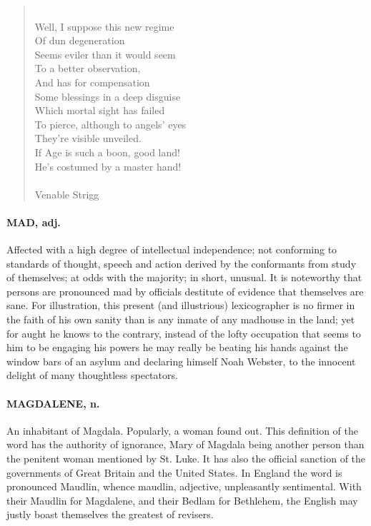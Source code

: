 \documentclass[11pt]{article}
\begin{document}
\begin{quote}
 \\
  Well, I suppose this new regime \\
      Of dun degeneration \\
  Seems eviler than it would seem \\
      To a better observation, \\
      And has for compensation \\
  Some blessings in a deep disguise \\
      Which mortal sight has failed \\
  To pierce, although to angels' eyes \\
      They're visible unveiled. \\
  If Age is such a boon, good land! \\
  He's costumed by a master hand! \\
 \\
Venable Strigg \end{quote}


\paragraph{MAD, adj.}  Affected with a high degree of intellectual independence;
not conforming to standards of thought, speech and action derived by
the conformants from study of themselves; at odds with the majority;
in short, unusual.  It is noteworthy that persons are pronounced mad
by officials destitute of evidence that themselves are sane.  For
illustration, this present (and illustrious) lexicographer is no
firmer in the faith of his own sanity than is any inmate of any
madhouse in the land; yet for aught he knows to the contrary, instead
of the lofty occupation that seems to him to be engaging his powers he
may really be beating his hands against the window bars of an asylum
and declaring himself Noah Webster, to the innocent delight of many
thoughtless spectators.

\paragraph{MAGDALENE, n.}  An inhabitant of Magdala.  Popularly, a woman found
out.  This definition of the word has the authority of ignorance, Mary
of Magdala being another person than the penitent woman mentioned by
St. Luke.  It has also the official sanction of the governments of
Great Britain and the United States.  In England the word is
pronounced Maudlin, whence maudlin, adjective, unpleasantly
sentimental.  With their Maudlin for Magdalene, and their Bedlam for
Bethlehem, the English may justly boast themselves the greatest of
revisers.
\end{document}

